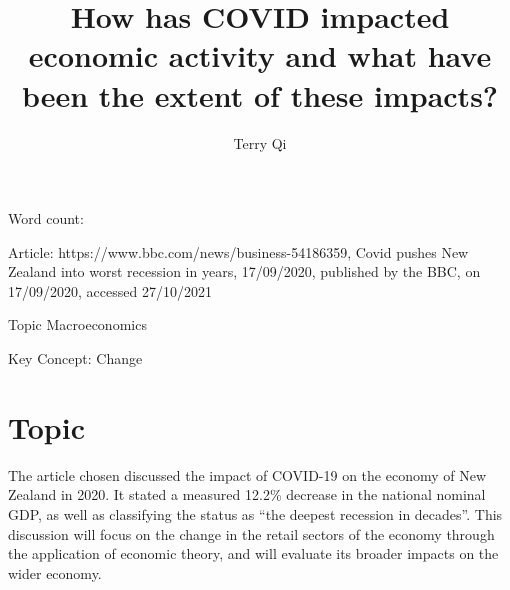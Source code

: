 \documentclass[a4paper,12pt]{article}
\title{How has COVID impacted economic activity and what have been the extent of these impacts?}
\author{Terry Qi}
\begin{document}
\maketitle
\newpage
Word count:

Article: https://www.bbc.com/news/business-54186359, Covid pushes New Zealand into worst recession in years, 17/09/2020, published by the BBC, on 17/09/2020, accessed 27/10/2021

Topic Macroeconomics

Key Concept: Change












\section*{Topic}
The article chosen discussed the impact of COVID-19 on the economy of New Zealand in 2020. It stated a measured 12.2\% decrease in the national nominal GDP, as well as classifying the status as ``the deepest recession in decades''. This discussion will focus on the change in the retail sectors of the economy through the application of economic theory, and will evaluate its broader impacts on the wider economy.
\end{document}
